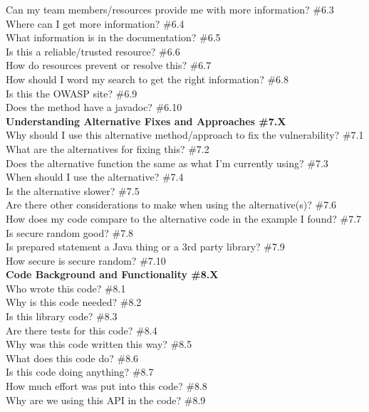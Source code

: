 \documentclass[10pt,journal,compsoc]{IEEEtran}
\begin{document}
	Can my team members/resources provide me with more information? \#6.3 \\
	Where can I get more information? \#6.4 \\
	What information is in the documentation? \#6.5 \\
	Is this a reliable/trusted resource? \#6.6 \\
	How do resources prevent or resolve this? \#6.7 \\
	How should I word my search to get the right information? \#6.8 \\
	Is this the OWASP site? \#6.9 \\
	Does the method have a javadoc? \#6.10 \\
\textbf{Understanding Alternative Fixes and Approaches \#7.X} \\
	Why should I use this alternative method/approach to fix the vulnerability? \#7.1 \\
	What are the alternatives for fixing this? \#7.2 \\
	Does the alternative function the same as what I'm currently using? \#7.3 \\
	When should I use the alternative?  \#7.4 \\
	Is the alternative slower?  \#7.5 \\
	Are there other considerations to make when using the alternative(s)? \#7.6 \\
	How does my code compare to the alternative code in the example I found? \#7.7 \\
	Is secure random good?  \#7.8 \\
	Is prepared statement a Java thing or a 3rd party library?  \#7.9 \\
	How secure is secure random?  \#7.10 \\
\textbf{Code Background and Functionality \#8.X} \\
	Who wrote this code? \#8.1 \\
	Why is this code needed? \#8.2  \\
	Is this library code? \#8.3 \\
	Are there tests for this code?  \#8.4 \\
	Why was this code written this way? \#8.5 \\
	What does this code do? \#8.6 \\
	Is this code doing anything? \#8.7 \\
	How much effort was put into this code? \#8.8 \\
	Why are we using this API in the code? \#8.9 \\
\end{document}
